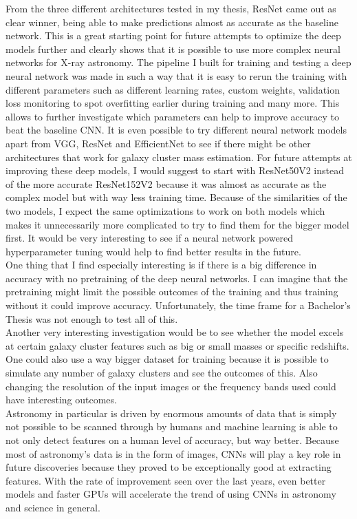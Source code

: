 From the three different architectures tested in my thesis, ResNet came out as clear winner, being able to make predictions almost as accurate as the baseline network. This is a great starting point for future attempts to optimize the deep models further and clearly shows that it is possible to use more complex neural networks for X-ray astronomy. The pipeline I built for training and testing a deep neural network was made in such a way that it is easy to rerun the training with different parameters such as different learning rates, custom weights, validation loss monitoring to spot overfitting earlier during training and many more. This allows to further investigate which parameters can help to improve accuracy to beat the baseline CNN. It is even possible to try different neural network models apart from VGG, ResNet and EfficientNet to see if there might be other architectures that work for galaxy cluster mass estimation. For future attempts at improving these deep models, I would suggest to start with ResNet50V2 instead of the more accurate ResNet152V2 because it was almost as accurate as the complex model but with way less training time. Because of the similarities of the two models, I expect the same optimizations to work on both models which makes it unnecessarily more complicated to try to find them for the bigger model first. It would be very interesting to see if a neural network powered hyperparameter tuning would help to find better results in the future. \\
One thing that I find especially interesting is if there is a big difference in accuracy with no pretraining of the deep neural networks. I can imagine that the pretraining might limit the possible outcomes of the training and thus training without it could improve accuracy. Unfortunately, the time frame for a Bachelor's Thesis was not enough to test all of this.\\
Another very interesting investigation would be to see whether the model excels at certain galaxy cluster features such as big or small masses or specific redshifts. One could also use a way bigger dataset for training because it is possible to simulate any number of galaxy clusters and see the outcomes of this. Also changing the resolution of the input images or the frequency bands used could have interesting outcomes. \\ 

Astronomy in particular is driven by enormous amounts of data that is simply not possible to be scanned through by humans and machine learning is able to not only detect features on a human level of accuracy, but way better. Because most of astronomy's data is in the form of images, CNNs will play a key role in future discoveries because they proved to be exceptionally good at extracting features. With the rate of improvement seen over the last years, even better models and faster GPUs will accelerate the trend of using CNNs in astronomy and science in general.  \\

